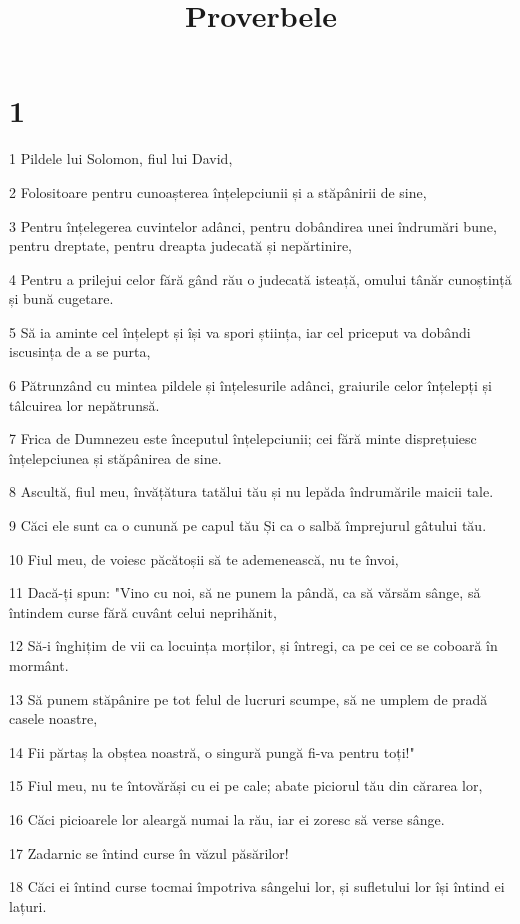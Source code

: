 

\title{Proverbele}


\chapter{1}

\par 1 Pildele lui Solomon, fiul lui David,
\par 2 Folositoare pentru cunoașterea înțelepciunii și a stăpânirii de sine,
\par 3 Pentru înțelegerea cuvintelor adânci, pentru dobândirea unei îndrumări bune, pentru dreptate, pentru dreapta judecată și nepărtinire,
\par 4 Pentru a prilejui celor fără gând rău o judecată isteață, omului tânăr cunoștință și bună cugetare.
\par 5 Să ia aminte cel înțelept și își va spori știința, iar cel priceput va dobândi iscusința de a se purta,
\par 6 Pătrunzând cu mintea pildele și înțelesurile adânci, graiurile celor înțelepți și tâlcuirea lor nepătrunsă.
\par 7 Frica de Dumnezeu este începutul înțelepciunii; cei fără minte disprețuiesc înțelepciunea și stăpânirea de sine.
\par 8 Ascultă, fiul meu, învățătura tatălui tău și nu lepăda îndrumările maicii tale.
\par 9 Căci ele sunt ca o cunună pe capul tău Și ca o salbă împrejurul gâtului tău.
\par 10 Fiul meu, de voiesc păcătoșii să te ademenească, nu te învoi,
\par 11 Dacă-ți spun: "Vino cu noi, să ne punem la pândă, ca să vărsăm sânge, să întindem curse fără cuvânt celui neprihănit,
\par 12 Să-i înghițim de vii ca locuința morților, și întregi, ca pe cei ce se coboară în mormânt.
\par 13 Să punem stăpânire pe tot felul de lucruri scumpe, să ne umplem de pradă casele noastre,
\par 14 Fii părtaș la obștea noastră, o singură pungă fi-va pentru toți!"
\par 15 Fiul meu, nu te întovărăși cu ei pe cale; abate piciorul tău din cărarea lor,
\par 16 Căci picioarele lor aleargă numai la rău, iar ei zoresc să verse sânge.
\par 17 Zadarnic se întind curse în văzul păsărilor!
\par 18 Căci ei întind curse tocmai împotriva sângelui lor, și sufletului lor își întind ei lațuri.
